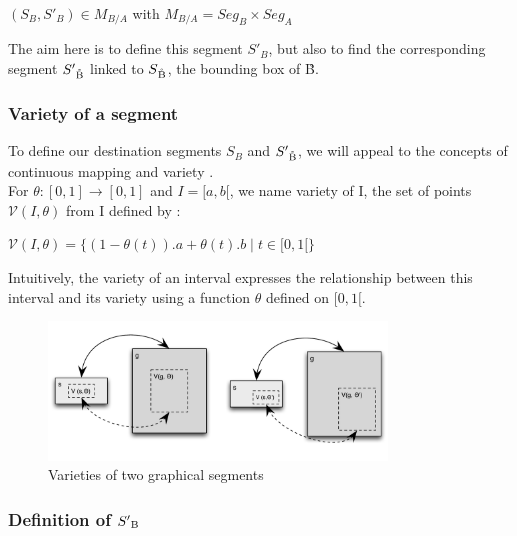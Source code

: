 \documentclass[a4paper]{article}
\newcommand{\variete}			{\ensuremath{\mathcal{V}}}
\begin{document}
\begin{center} $(S_B, S'_B) \in M_{B/A}$ with $M_{B/A} = Seg_B \times Seg_A$ \end{center}

The aim here is to define this segment $S'_B$, but also to find the corresponding segment $S'\textsubscript{\r{B}}$ linked to $S\textsubscript{\r{B}}$, the bounding box of \r{B}.

\subsubsection{Variety of a segment}\label{subsubsec:variety}

To define our destination segments $S_B$ and $S'\textsubscript{\r{B}}$, we will appeal to the concepts of continuous mapping and variety \cite{fober12cmj2}.%
\\

For $\theta : [0,1] \rightarrow [0,1]$ and $I = [a,b[$, we name variety of I, the set of points $\variete(I,\theta)$ from I defined by :
\begin{center}
$\variete(I, \theta) =  \lbrace (1 - \theta(t)).a + \theta(t).b \mid t \in [0, 1[ \rbrace$ 
\end{center}

Intuitively, the variety of an interval expresses the relationship between this interval and its variety using a function $\theta$ defined on $[0, 1[$.
\\
\begin{figure}[h]
\centering
\includegraphics[width=9cm]{img/vmapping.pdf}
\caption{Varieties of two graphical segments}
\label{fig:variety}
\end{figure}

\subsubsection{Definition of $S'\textsubscript{B}$}\label{subsubsec:defDestRect}
\end{document}
